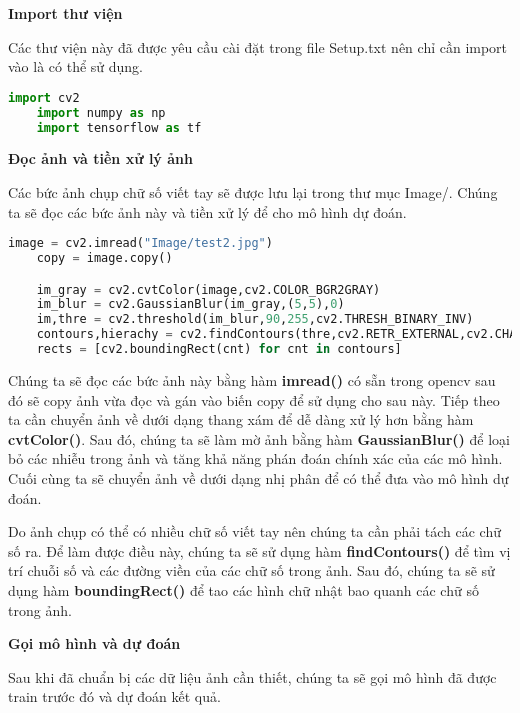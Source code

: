 \textbf{Import thư viện}

Các thư viện này đã được yêu cầu cài đặt trong file Setup.txt nên chỉ cần import vào là có thể sử dụng.
\begin{lstlisting}[language = Python]
    import cv2
    import numpy as np
    import tensorflow as tf
\end{lstlisting}

\textbf{Đọc ảnh và tiền xử lý ảnh}

Các bức ảnh chụp chữ số viết tay sẽ được lưu lại trong thư mục Image/. Chúng ta sẽ đọc các bức ảnh này và tiền xử lý để cho mô hình dự đoán.

\begin{lstlisting}[language = Python]
    image = cv2.imread("Image/test2.jpg")
    copy = image.copy()

    im_gray = cv2.cvtColor(image,cv2.COLOR_BGR2GRAY)
    im_blur = cv2.GaussianBlur(im_gray,(5,5),0)
    im,thre = cv2.threshold(im_blur,90,255,cv2.THRESH_BINARY_INV)
    contours,hierachy = cv2.findContours(thre,cv2.RETR_EXTERNAL,cv2.CHAIN_APPROX_SIMPLE)
    rects = [cv2.boundingRect(cnt) for cnt in contours]

\end{lstlisting}

Chúng ta sẽ đọc các bức ảnh này bằng hàm \textbf{imread()} có sẵn trong opencv sau đó sẽ copy ảnh vừa đọc và gán vào biến copy để sử dụng cho sau này.
Tiếp theo ta cần chuyển ảnh về dưới dạng thang xám để dễ dàng xử lý hơn bằng hàm \textbf{cvtColor()}.
Sau đó, chúng ta sẽ làm mờ ảnh bằng hàm \textbf{GaussianBlur()} để loại bỏ các nhiễu trong ảnh và tăng khả năng phán đoán chính xác của các mô hình.
Cuối cùng ta sẽ chuyển ảnh về dưới dạng nhị phân để có thể đưa vào mô hình dự đoán.

Do ảnh chụp có thể có nhiều chữ số viết tay nên chúng ta cần phải tách các chữ số ra. Để làm được điều này, chúng ta sẽ sử dụng hàm \textbf{findContours()} 
để tìm vị trí chuỗi số và các đường viền của các chữ số trong ảnh. Sau đó, chúng ta sẽ sử dụng hàm \textbf{boundingRect()} để tao các hình chữ nhật bao quanh các chữ số trong ảnh.

\textbf{Gọi mô hình và dự đoán}

Sau khi đã chuẩn bị các dữ liệu ảnh cần thiết, chúng ta sẽ gọi mô hình đã được train trước đó và dự đoán kết quả.

